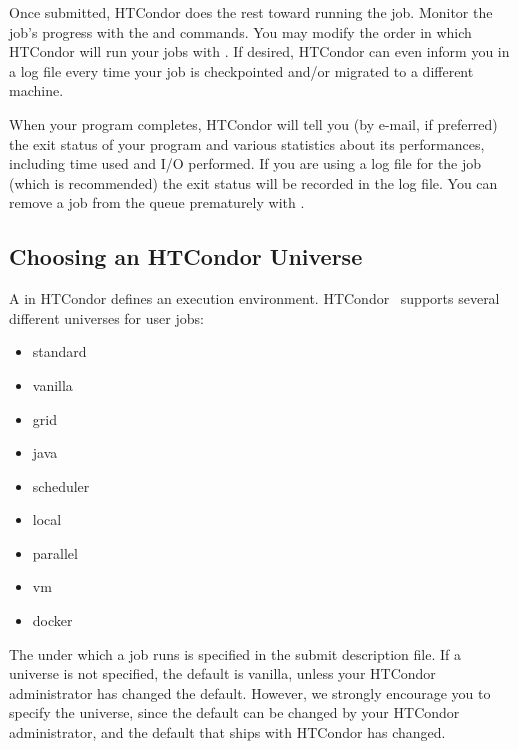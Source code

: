 Once submitted, HTCondor does the rest toward running
the job.
Monitor the job's progress with the 
and  commands.
You may modify the order in which HTCondor will run your jobs with
. If desired, HTCondor can even inform you in a log file 
every time your job is checkpointed and/or migrated to a different machine. 

When your program completes, HTCondor will tell you
(by e-mail, if preferred) the exit status of your program and various
statistics about its performances, including time used and I/O performed.
If you are using a log file for the job (which is recommended) the exit
status will be recorded in the log file.
You can remove a job from the
queue prematurely with . 


\subsection{\label{sec:Choosing-Universe}
Choosing an HTCondor Universe}

A  in HTCondor
defines an execution environment. 
HTCondor \VersionNotice\ supports several different
universes for user jobs:
\begin{itemize}
	\item standard
	\item vanilla
	\item grid
	\item java
	\item scheduler
	\item local
 	\item parallel
 	\item vm
  	\item docker
\end{itemize}

The  under which a job runs
is specified in the submit description file.
If a universe is not specified,
the default is vanilla,
unless your HTCondor administrator has changed the default.
However, we strongly encourage you to specify the universe,
since the default can be changed by your HTCondor administrator,
and the default that ships with HTCondor has changed.

